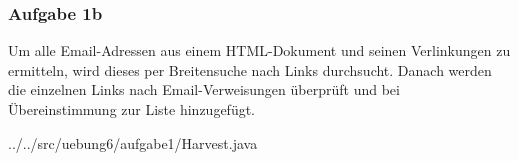 \subsubsection*{Aufgabe 1b}
Um alle Email-Adressen aus einem HTML-Dokument und seinen Verlinkungen zu ermitteln,
wird dieses per Breitensuche nach Links durchsucht.
Danach werden die einzelnen Links nach Email-Verweisungen überprüft und bei Übereinstimmung zur Liste hinzugefügt. 

{../../src/uebung6/aufgabe1/Harvest.java}
